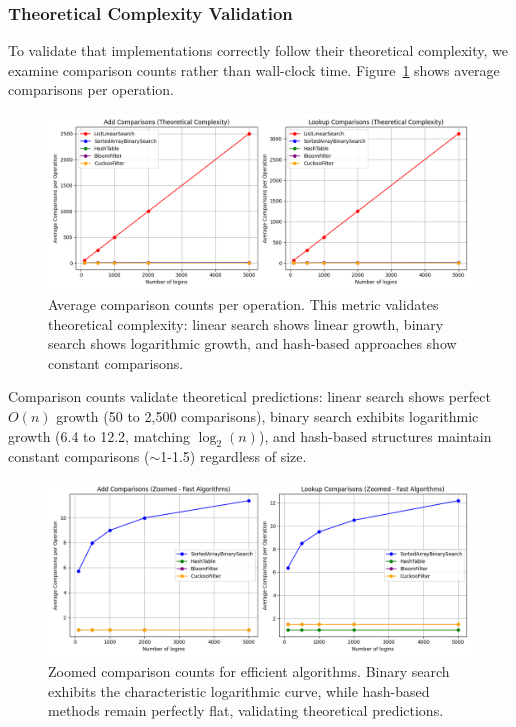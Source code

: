 \subsubsection{Theoretical Complexity Validation}

To validate that implementations correctly follow their theoretical complexity, we examine comparison counts rather than wall-clock time. Figure~\ref{fig:comparisons_full} shows average comparisons per operation.

\begin{figure}[h]
    \centering
    \includegraphics[width=\textwidth]{../img/login_checker_comparisons.png}
    \caption{Average comparison counts per operation. This metric validates theoretical complexity: linear search shows linear growth, binary search shows logarithmic growth, and hash-based approaches show constant comparisons.}
    \label{fig:comparisons_full}
\end{figure}

Comparison counts validate theoretical predictions: linear search shows perfect $O(n)$ growth (50 to 2,500 comparisons), binary search exhibits logarithmic growth (6.4 to 12.2, matching $\log_2(n)$), and hash-based structures maintain constant comparisons ($\sim$1-1.5) regardless of size.

\begin{figure}[h]
    \centering
    \includegraphics[width=\textwidth]{../img/login_checker_comparisons_zoomed.png}
    \caption{Zoomed comparison counts for efficient algorithms. Binary search exhibits the characteristic logarithmic curve, while hash-based methods remain perfectly flat, validating theoretical predictions.}
    \label{fig:comparisons_zoomed}
\end{figure}

